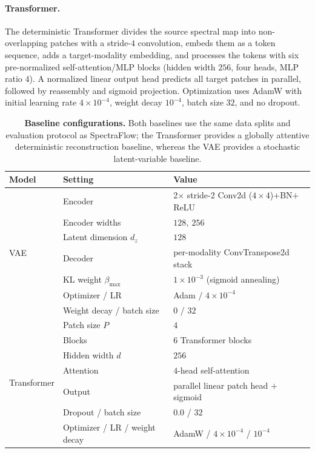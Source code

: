 \documentclass[pdflatex,sn-mathphys-num]{sn-jnl}%
\newcommand{\mname}{SpectraFlow}
\theoremstyle{thmstyleone}%
\theoremstyle{thmstyletwo}%
\theoremstyle{thmstylethree}%
\begin{document}
\begin{appendices}
\paragraph{Transformer.} The deterministic Transformer divides the source spectral map into non-overlapping patches with a stride-$4$ convolution, embeds them as a token sequence, adds a target-modality embedding, and processes the tokens with six pre-normalized self-attention/MLP blocks (hidden width $256$, four heads, MLP ratio $4$). A normalized linear output head predicts all target patches in parallel, followed by reassembly and sigmoid projection. Optimization uses AdamW with initial learning rate $4\times10^{-4}$, weight decay $10^{-4}$, batch size $32$, and no dropout.

\begin{table}[htbp]
\centering
\caption{\textbf{Baseline configurations.} Both baselines use the same data splits and evaluation protocol as \mname; the Transformer provides a globally attentive deterministic reconstruction baseline, whereas the VAE provides a stochastic latent-variable baseline.}
\label{tab:baselines}
\begin{tabular}{@{}lll@{}}
\toprule
Model & Setting & Value \\
\midrule
\multirow{7}{*}{VAE}
 & Encoder & 2$\times$ stride-2 Conv2d ($4\times4$)$+$BN$+$ReLU \\
 & Encoder widths & $128,\ 256$ \\
 & Latent dimension $d_z$ & $128$ \\
 & Decoder & per-modality ConvTranspose2d stack \\
 & KL weight $\beta_{\max}$ & $1\times10^{-3}$ (sigmoid annealing) \\
 & Optimizer / LR & Adam / $4\times10^{-4}$ \\
 & Weight decay / batch size & $0$ / $32$ \\
\midrule
\multirow{7}{*}{Transformer}
 & Patch size $P$ & $4$ \\
 & Blocks & $6$ Transformer blocks \\
 & Hidden width $d$ & $256$ \\
 & Attention & $4$-head self-attention \\
 & Output & parallel linear patch head $+$ sigmoid \\
 & Dropout / batch size & $0.0$ / $32$ \\
 & Optimizer / LR / weight decay & AdamW / $4\times10^{-4}$ / $10^{-4}$ \\
\bottomrule
\end{tabular}
\end{table}

\end{appendices}
\clearpage

\end{document}

